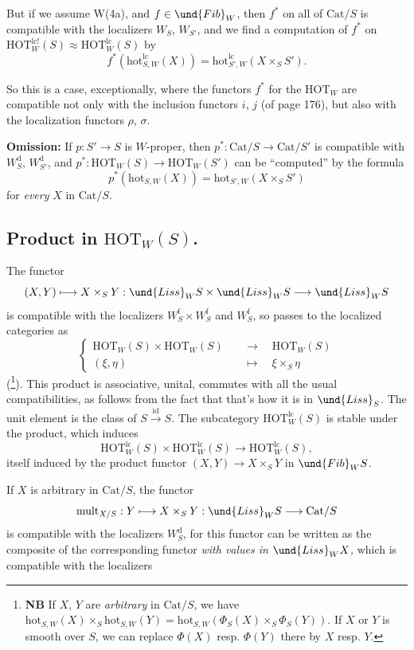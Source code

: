 But if we assume W(4a), and $f \in \und{Fib}_W$, then $f^*$ on all of $\mathrm{Cat}/S$ is compatible with the localizers $W_S$, $W_{S'}$, and we find a computation of $f^*$ on $\mathrm{HOT}^{\mathrm{lc!}}_W(S) \approx \mathrm{HOT}^{\mathrm{lc}}_W(S)$ by
\[
f^*(\mathrm{hot}^{\mathrm{lc}}_{S,W}(X)) = \mathrm{hot}^{\mathrm{lc}}_{S',W}(X \times_S S').
\]

So this is a case, exceptionally, where the functors $f^*$ for the $\mathrm{HOT}_W$ are compatible not only with the inclusion functors $i$, $j$ (of page 176), but also with the localization functors $\rho$, $\sigma$. %

\textbf{Omission:} If $p : S' \longrightarrow S$ is $W$-proper, then $p^* : \mathrm{Cat}/S \longrightarrow \mathrm{Cat}/S'$ is compatible with $W_S^{\mathrm{d}}$, $W_{S'}^{\mathrm{d}}$, and $p^* : \mathrm{HOT}_W(S) \longrightarrow \mathrm{HOT}_W(S')$ can be ``computed'' by the formula
\[
p^*(\mathrm{hot}_{S,W}(X)) = \mathrm{hot}_{S',W}(X \times_S S')
\]
for \textit{every} $X$ in $\mathrm{Cat}/S$.

\subsection*{ Product in $\mathrm{HOT}_W(S)$.}

The functor
\[
(X, Y) \longmapsto X \times_S Y : \und{Liss}_W S \times \und{Liss}_W S \longrightarrow \und{Liss}_W S
\]
is compatible with the localizers $W_S^{\mathrm{f}} \times W_S^{\mathrm{f}}$ and $W_S^{\mathrm{f}}$, so passes to the localized categories as
\[
\left\{
\begin{aligned}
\mathrm{HOT}_W(S) \times \mathrm{HOT}_W(S) &\quad\longrightarrow\quad \mathrm{HOT}_W(S)\\
(\xi, \eta) &\quad\longmapsto\quad \xi \times_S \eta
\end{aligned}
\right.
\]
(\footnote[97]{\textbf{NB} If $X$, $Y$ are \textit{arbitrary} in $\mathrm{Cat}/S$, we have $\mathrm{hot}_{S,W}(X) \times_S \mathrm{hot}_{S,W}(Y) = \mathrm{hot}_{S,W}(\Phi_S(X) \times_S \Phi_S(Y))$. If $X$ or $Y$ is smooth over $S$, we can replace $\Phi(X)$ resp. $\Phi(Y)$ there by $X$ resp. $Y$.}). This product is associative, unital, commutes with all the usual compatibilities, as follows from the fact that that's how it is in $\und{Liss}_S$. The unit element is the class of $S \xrightarrow{\mathrm{id}} S$. The subcategory $\mathrm{HOT}^{\mathrm{lc}}_W(S)$ is stable under the product, which induces
\[
\mathrm{HOT}^{\mathrm{lc}}_W(S) \times \mathrm{HOT}^{\mathrm{lc}}_W(S) \longrightarrow \mathrm{HOT}^{\mathrm{lc}}_W(S),
\]
itself induced by the product functor $(X, Y) \longrightarrow X \times_S Y$ in $\und{Fib}_W S$.

If $X$ is arbitrary in $\mathrm{Cat}/S$, the functor
\[
\mathrm{mult}_{X/S} : Y \longmapsto X \times_S Y : \und{Liss}_W S \longrightarrow \mathrm{Cat}/S
\]
is compatible with the localizers $W_S^{\mathrm{d}}$, for this functor can be written as the composite of the corresponding functor \textit{with values in $\und{Liss}_W X$,} which is compatible with the localizers %